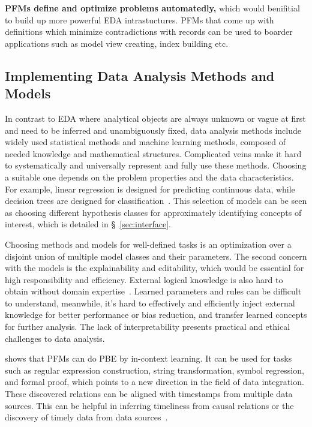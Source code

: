   
\begin{takeawaybox}
\textbf{PFMs define and optimize problems automatedly,} which would benifitial to build up more powerful EDA intrastuctures. PFMs that come up with definitions which minimize contradictions with records can be used to boarder applications such as model view creating, index building etc.~\cite{JiangSQLZZY25}
\end{takeawaybox}


  
  \subsection{Implementing Data Analysis Methods and Models}\label{sec:da_methods}
  
  In contrast to EDA where analytical objects are always unknown or vague at first and need to be inferred and unambiguously fixed, data analysis methods include widely used statistical methods and machine learning methods, composed of needed knowledge and mathematical structures. Complicated veins make it hard to systematically and universally represent and fully use these methods. Choosing a suitable one depends on the problem properties and the data characteristics. For example, linear regression is designed for predicting continuous data, while decision trees are designed for classification~\cite{032hastie2009elements}. This selection of models can be seen as choosing different hypothesis classes for approximately identifying concepts of interest, which is detailed in \S~\ref{sec:interface}. 
  
  Choosing methods and models for well-defined tasks is an optimization over a disjoint union of multiple model classes and their parameters. The second concern with the models is the explainability and editability, which would be essential for high responsibility and efficiency. External logical knowledge is also hard to obtain without domain expertise~\cite{031guyon2003introduction}. Learned parameters and rules can be difficult to understand, meanwhile, it's hard to effectively and efficiently inject external knowledge for better performance or bias reduction, and transfer learned concepts for further analysis. The lack of interpretability presents practical and ethical challenges to data analysis. 

  \cite{Li2024IsPB} shows that PFMs can do PBE by in-context learning. It can be used for tasks such as regular expression construction, string transformation, symbol regression, and formal proof, which points to a new direction in the field of data integration. These discovered relations can be aligned with timestamps from multiple data sources. This can be helpful in inferring timeliness from causal relations or the discovery of timely data from data sources~\cite{Wang2023SoloDD}.
  
